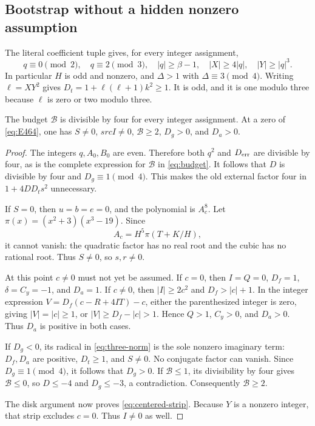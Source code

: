 \subsection{Bootstrap without a hidden nonzero assumption}

The literal coefficient tuple gives, for every integer assignment,
\[
 q\equiv0\pmod2,\quad q\equiv2\pmod3,\quad
 |q|\ge\beta-1,\quad |X|\ge4|q|,\quad |Y|\ge|q|^3.
\]
In particular $H$ is odd and nonzero, and $\Delta>1$ with
$\Delta\equiv3\pmod4$. Writing $\ell=XY^2$ gives
$D_t=1+\ell(\ell+1)k^2\ge1$. It is odd, and it is one modulo three
because $\ell$ is zero or two modulo three.

\begin{lemma}\label{lem:guard}
The budget $\mathcal B$ is divisible by four for every integer
assignment. At a zero of \eqref{eq:E464}, one has
$S\ne0$, $s r c I\ne0$, $\mathcal B\ge2$, $D_g>0$, and $D_a>0$.
\end{lemma}
\begin{proof}
The integers $q,A_0,B_0$ are even. Therefore both $q^2$ and
$D_{\rm err}$ are divisible by four, as is the complete expression
for $\mathcal B$ in \eqref{eq:budget}. It follows that $D$ is divisible
by four and $D_g\equiv1\pmod4$. This makes the old external factor
four in $1+4DD_t s^2$ unnecessary.

If $S=0$, then $u=b=e=0$, and the polynomial is $A_c^8$.
Let $\pi(x)=(x^2+3)(x^3-19)$. Since
\[
 A_c=H^5\pi(T+K/H),
\]
it cannot vanish: the quadratic factor has no real root and the cubic
has no rational root. Thus $S\ne0$, so $s,r\ne0$.

At this point $c\ne0$ must not yet be assumed. If $c=0$, then
$I=Q=0$, $D_f=1$, $\delta=C_y=-1$, and $D_a=1$.
If $c\ne0$, then $|I|\ge2c^2$ and $D_f>|c|+1$. In the integer
expression $V=D_f(c-R+4IT)-c$, either the parenthesized integer is zero,
giving $|V|=|c|\ge1$, or $|V|\ge D_f-|c|>1$. Hence $Q>1$,
$C_y>0$, and $D_a>0$. Thus $D_a$ is positive in both cases.

If $D_g<0$, its radical in \eqref{eq:three-norm} is the sole nonzero
imaginary term: $D_f,D_a$ are positive, $D_t\ge1$, and $S\ne0$.
No conjugate factor can vanish. Since $D_g\equiv1\pmod4$, it follows
that $D_g>0$. If $\mathcal B\le1$, its divisibility by four gives
$\mathcal B\le0$, so $D\le-4$ and $D_g\le-3$, a contradiction.
Consequently $\mathcal B\ge2$.

The disk argument now proves \eqref{eq:centered-strip}. Because $Y$ is
a nonzero integer, that strip excludes $c=0$. Thus $I\ne0$ as well.
\end{proof}

